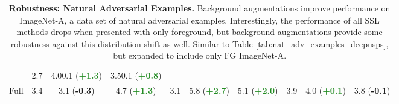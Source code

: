 \documentclass[twoside,11pt]{article}
\begin{document}
\begin{table}
{\begin{tabular}{cccccccccl}
& 2.7 & 4.0{\scriptsize{0.1}} (\textbf{\textcolor{ForestGreen}{+1.3}}) &3.5{\scriptsize{0.1}} (\textbf{\textcolor{ForestGreen}{+0.8}})  \\
Full 
& 3.4  & 3.1 (\textbf{\textcolor{BrickRed}{-0.3}})  & 4.7 (\textbf{\textcolor{ForestGreen}{+1.3}})
& 3.1  & 5.8 (\textbf{\textcolor{ForestGreen}{+2.7}})  & 5.1 (\textbf{\textcolor{ForestGreen}{+2.0}})  
& 3.9  & 4.0 (\textbf{\textcolor{ForestGreen}{+0.1}})  & 3.8 (\textbf{\textcolor{BrickRed}{-0.1}})  \\  
\bottomrule
    \end{tabular}
    }
    \caption{\textbf{Robustness: Natural Adversarial Examples.} Background augmentations improve performance on ImageNet-A, a data set of natural adversarial examples.  Interestingly, the performance of all SSL methods drops when presented with only foreground, but background augmentations provide some robustness against this distribution shift as well. Similar to Table \ref{tab:nat_adv_examples_deepusps}, but expanded to include only FG ImageNet-A.}
    \label{app:nat_adv_examples_deepusps_extended}
\end{table}
\end{document}
